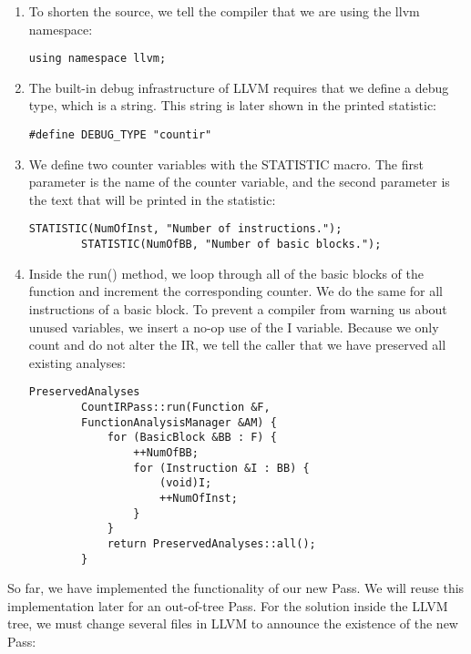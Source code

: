 \begin{enumerate}
	\item To shorten the source, we tell the compiler that we are using the llvm namespace:
	\begin{lstlisting}[caption={}]
		using namespace llvm;
	\end{lstlisting}
	
	\item The built-in debug infrastructure of LLVM requires that we define a debug type, which is a string. This string is later shown in the printed statistic:
	\begin{lstlisting}[caption={}]
		#define DEBUG_TYPE "countir"
	\end{lstlisting}
	
	\item We define two counter variables with the STATISTIC macro. The first parameter is the name of the counter variable, and the second parameter is the text that will be printed in the statistic:
	\begin{lstlisting}[caption={}]
		STATISTIC(NumOfInst, "Number of instructions.");
		STATISTIC(NumOfBB, "Number of basic blocks.");
	\end{lstlisting}
	
	\item Inside the run() method, we loop through all of the basic blocks of the function and increment the corresponding counter. We do the same for all instructions of a basic block. To prevent a compiler from warning us about unused variables, we insert a no-op use of the I variable. Because we only count and do not alter the IR, we tell the caller that we have preserved all existing analyses:
	\begin{lstlisting}[caption={}]
		PreservedAnalyses
		CountIRPass::run(Function &F,
		FunctionAnalysisManager &AM) {
			for (BasicBlock &BB : F) {
				++NumOfBB;
				for (Instruction &I : BB) {
					(void)I;
					++NumOfInst;
				}
			}
			return PreservedAnalyses::all();
		}
	\end{lstlisting}
	
\end{enumerate}

So far, we have implemented the functionality of our new Pass. We will reuse this implementation later for an out-of-tree Pass. For the solution inside the LLVM tree, we must change several files in LLVM to announce the existence of the new Pass:\par

